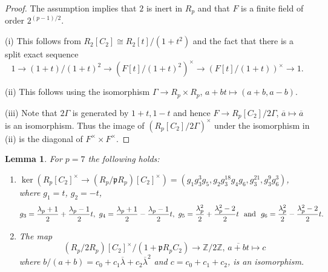 \documentclass[11pt,leqno,a4paper]{amsart}
\newcommand{\Z}{\mathbb{Z}}
\newtheorem{lemma}[thm]{Lemma}
\theoremstyle{definition}
\theoremstyle{remark}
\theoremstyle{custom}
\newenvironment{clist}[1]
{\begin{enumerate}[\normalfont #1]}
{\end{enumerate}}
\begin{document}
\begin{proof}
The assumption implies that $2$ is inert in $R_p$ and that $F$ is a finite field of order $2^{(p-1)/2}$.

(i) This follows from $R_2[C_2] \cong R_2[t]/(1 + t^2)$ and the fact that there is a split exact sequence
\[ 1 \to (1 + t)/(1 + t)^2 \to (F[t]/(1 + t)^2)^\times \to (F[t]/(1 + t))^\times \to 1. \]
  
(ii) This follows using the isomorphism $\Gamma \to R_p \times R_p$, $a + bt \mapsto (a + b, a - b)$.
  
(iii) Note that $2\Gamma$ is generated by $1 + t, 1 - t$ and hence $F \to R_p[C_2]/2 \Gamma$, $\overline a \mapsto \overline a$ is an isomorphism. Thus the image of $(R_p[C_2]/2\Gamma)^\times$ under the isomorphism in (ii) is the diagonal of $F^\times \times F^\times$.
\end{proof}

\begin{lemma}\label{lemma:p7}
For $p = 7$ the following holds:
\begin{clist}{(i)}
\item
$\ker(R_p[C_2]^\times \to (R_p/\mathfrak p R_p)[C_2]^\times) = (g_1 g_3^3 g_5, g_2 g_3^{18}g_4 g_6, g_3^{21}, g_3^9 g_6^3)$, where $g_1 = t$, $g_2 = -t$,
\[ g_{3} = \frac{\lambda_p + 1}2 + \frac{\lambda_p - 1}2 t, \,\, g_{4} = \frac{\lambda_p + 1}2 - \frac{\lambda_p - 1}2 t, \,\, g_{5} = \frac{\lambda_p^2}2 + \frac{\lambda_p^2 - 2}2 t \,\,\,\, \text{\normalfont and} \,\,\,\, g_{6} = \frac{\lambda_p^2}2 - \frac{\lambda_p^2 - 2}2 t.\]
\item
The map
\[ {(R_p/2R_p)[C_2]^\times}/({1+\mathfrak{p}R_pC_2}) \to \Z/2\Z, \, \overline{a + b t} \mapsto c \]
where $b/(a + b) = c_0 + c_1 \overline \lambda + c_2 \overline \lambda^2$ and $c = c_0 + c_1 + c_2$, is an isomorphism.
\end{clist}
\end{lemma}
\end{document}
